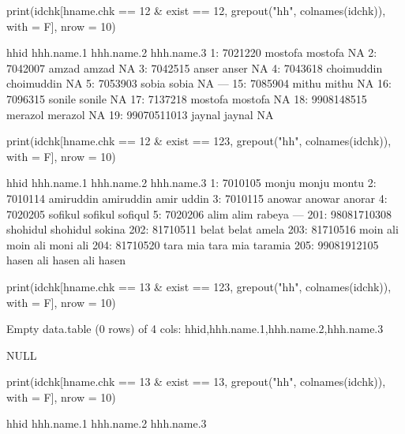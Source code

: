 \begin{Schunk}
\begin{Sinput}
print(idchk[hname.chk == 12  & exist == 12, 
	grepout("hh", colnames(idchk)), with = F], nrow = 10)
\end{Sinput}
\begin{Soutput}
           hhid hhh.name.1 hhh.name.2 hhh.name.3
 1:     7021220    mostofa    mostofa         NA
 2:     7042007      amzad      amzad         NA
 3:     7042515      anser      anser         NA
 4:     7043618 choimuddin choimuddin         NA
 5:     7053903      sobia      sobia         NA
---                                             
15:     7085904      mithu      mithu         NA
16:     7096315     sonile     sonile         NA
17:     7137218    mostofa    mostofa         NA
18:  9908148515    merazol    merazol         NA
19: 99070511013     jaynal     jaynal         NA
\end{Soutput}
\begin{Sinput}
print(idchk[hname.chk == 12  & exist == 123, 
	grepout("hh", colnames(idchk)), with = F], nrow = 10)
\end{Sinput}
\begin{Soutput}
            hhid hhh.name.1 hhh.name.2 hhh.name.3
  1:     7010105      monju      monju      montu
  2:     7010114  amiruddin  amiruddin amir uddin
  3:     7010115     anowar     anowar     anorar
  4:     7020205    sofikul    sofikul    sofiqul
  5:     7020206       alim       alim     rabeya
 ---                                             
201: 98081710308   shohidul   shohidul     sokina
202:    81710511      belat      belat      amela
203:    81710516   moin ali   moin ali   moni ali
204:    81710520   tara mia   tara mia    taramia
205: 99081912105  hasen ali  hasen ali      hasen
\end{Soutput}
\begin{Sinput}
print(idchk[hname.chk == 13  & exist == 123, 
	grepout("hh", colnames(idchk)), with = F], nrow = 10)
\end{Sinput}
\begin{Soutput}
Empty data.table (0 rows) of 4 cols: hhid,hhh.name.1,hhh.name.2,hhh.name.3
\end{Soutput}
\begin{Soutput}
NULL
\end{Soutput}
\begin{Sinput}
print(idchk[hname.chk == 13  & exist == 13, 
	grepout("hh", colnames(idchk)), with = F], nrow = 10)
\end{Sinput}
\begin{Soutput}
           hhid hhh.name.1 hhh.name.2 hhh.name.3

\end{Soutput}
\end{Schunk}
